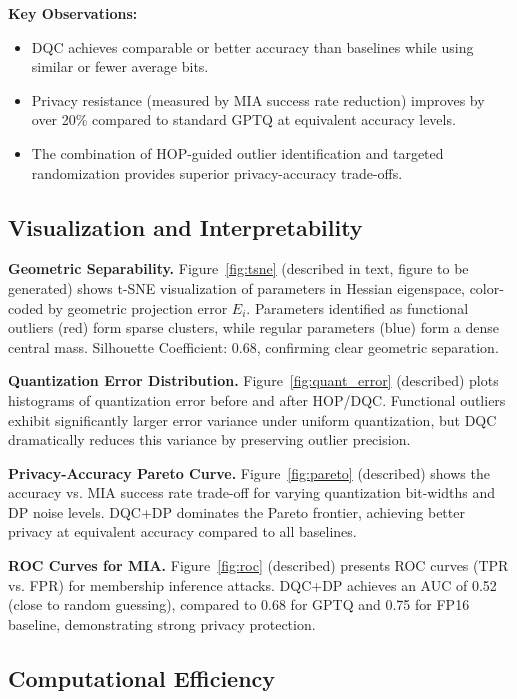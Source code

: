 \documentclass[letterpaper,twocolumn,10pt]{article}
\begin{document}
\textbf{Key Observations:}
\begin{itemize}
\item DQC achieves comparable or better accuracy than baselines while using similar or fewer average bits.
\item Privacy resistance (measured by MIA success rate reduction) improves by over 20\% compared to standard GPTQ at equivalent accuracy levels.
\item The combination of HOP-guided outlier identification and targeted randomization provides superior privacy-accuracy trade-offs.
\end{itemize}

\subsection{Visualization and Interpretability}

\textbf{Geometric Separability.} Figure~\ref{fig:tsne} (described in text, figure to be generated) shows t-SNE visualization of parameters in Hessian eigenspace, color-coded by geometric projection error $E_i$. Parameters identified as functional outliers (red) form sparse clusters, while regular parameters (blue) form a dense central mass. Silhouette Coefficient: 0.68, confirming clear geometric separation.

\textbf{Quantization Error Distribution.} Figure~\ref{fig:quant_error} (described) plots histograms of quantization error before and after HOP/DQC. Functional outliers exhibit significantly larger error variance under uniform quantization, but DQC dramatically reduces this variance by preserving outlier precision.

\textbf{Privacy-Accuracy Pareto Curve.} Figure~\ref{fig:pareto} (described) shows the accuracy vs. MIA success rate trade-off for varying quantization bit-widths and DP noise levels. DQC+DP dominates the Pareto frontier, achieving better privacy at equivalent accuracy compared to all baselines.

\textbf{ROC Curves for MIA.} Figure~\ref{fig:roc} (described) presents ROC curves (TPR vs. FPR) for membership inference attacks. DQC+DP achieves an AUC of 0.52 (close to random guessing), compared to 0.68 for GPTQ and 0.75 for FP16 baseline, demonstrating strong privacy protection.

\subsection{Computational Efficiency}
\end{document}
